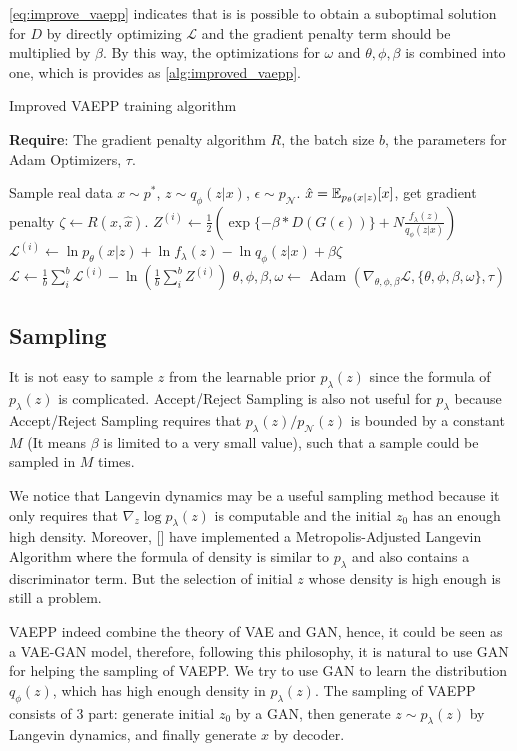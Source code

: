 \cref{eq:improve_vaepp} indicates that is is possible to obtain a suboptimal solution for $D$ by directly optimizing $\mathcal{L}$ and the gradient penalty term should be multiplied by $\beta$. By this way, the optimizations for $\omega$ and $\theta, \phi, \beta$ is combined into one, which is provides as \cref{alg:improved_vaepp}. 

\begin{algorithm}[tb]
\caption{Improved VAEPP training algorithm}
\label{alg:improved_vaepp}
\textbf{Require}: The gradient penalty algorithm $R$, the batch size $b$, the parameters for Adam Optimizers, $\tau$. 

\begin{algorithmic}[1] %
\STATE Sample real data $x \sim p^*$, $z \sim q_\phi(z|x)$, $\epsilon \sim p_\mathcal{N}$.
\STATE $\hat{x} = \operatorname{\mathbb{E}}_{p_\theta(x|z)}[x]$, get gradient penalty $\zeta \gets R(x, \hat{x})$. 
\STATE $Z^{(i)} \gets \frac{1}{2}(\exp\{-\beta * D(G(\epsilon))\} + N \frac{f_\lambda(z)}{q_\phi(z|x)})$
\STATE $\mathcal{L}^{(i)} \gets \ln p_\theta(x|z) + \ln f_\lambda(z) - \ln q_\phi(z|x) + \beta \zeta$
\ENDFOR
\STATE $\mathcal{L} \gets \frac{1}{b}\sum_{i}^b \mathcal{L}^{(i)} - \ln (\frac{1}{b}\sum_{i}^b Z^{(i)})$
\STATE $\theta, \phi, \beta, \omega \gets $ Adam $(\nabla_{\theta, \phi, \beta} \mathcal{L}, \{\theta, \phi, \beta, \omega\}, \tau)$
\ENDWHILE
\end{algorithmic}
\end{algorithm}

\subsection{Sampling}
It is not easy to sample $z$ from the learnable prior $p_\lambda(z)$ since the formula of $p_\lambda(z)$ is complicated. Accept/Reject Sampling is also not useful for $p_\lambda$ because Accept/Reject Sampling requires that $p_\lambda(z) / p_\mathcal{N}(z)$ is bounded by a constant $M$ (It means $\beta$ is limited to a very small value), such that a sample could be sampled in $M$ times. 

We notice that Langevin dynamics may be a useful sampling method because it only requires that $\nabla_z \log p_\lambda(z)$ is computable and the initial $z_0$ has an enough high density. Moreover, [] have implemented a Metropolis-Adjusted Langevin Algorithm where the formula of density is similar to $p_\lambda$ and also contains a discriminator term. But the selection of initial $z$ whose density is high enough is still a problem. 

VAEPP indeed combine the theory of VAE and GAN, hence, it could be seen as a VAE-GAN model, therefore, following this philosophy, it is natural to use GAN for helping the sampling of VAEPP. We try to use GAN to learn the distribution $q_\phi(z)$, which has high enough density in $p_\lambda(z)$. The sampling of VAEPP consists of 3 part: generate initial $z_0$ by a GAN, then generate $z \sim p_\lambda(z)$ by Langevin dynamics, and finally generate $x$ by decoder. 


 
 